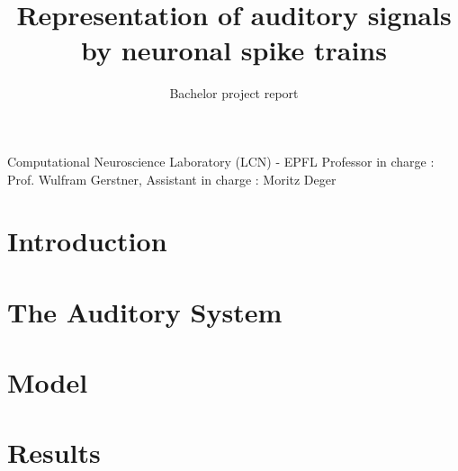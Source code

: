 \documentclass[nocopyrightspace,11pt,authoryear,preprint]{sigplanconf}
\begin{document}
\title{Representation of auditory signals by neuronal spike trains}
\subtitle{Bachelor project report} 

           {Computational Neuroscience Laboratory (LCN) - EPFL}
					 {Professor in charge : Prof. Wulfram Gerstner, 
					Assistant in charge : Moritz Deger}

\maketitle

\section{Introduction}


\section{The Auditory System}


\section{Model}


\section{Results}





\end{document}
